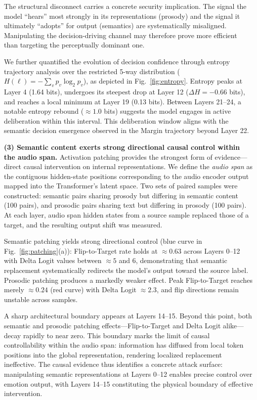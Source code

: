 The structural disconnect carries a concrete security implication. The signal the model ``hears'' most strongly in its representations (prosody) and the signal it ultimately ``adopts'' for output (semantics) are systematically misaligned. Manipulating the decision-driving channel may therefore prove more efficient than targeting the perceptually dominant one.

We further quantified the evolution of decision confidence through entropy trajectory analysis over the restricted 5-way distribution ($H(\ell) = -\sum_v p_v \log_2 p_v$), as depicted in Fig.~\ref{fig:entropy}. Entropy peaks at Layer 4 (1.64 bits), undergoes its steepest drop at Layer 12 ($\Delta H = -0.66$ bits), and reaches a local minimum at Layer 19 (0.13 bits). Between Layers 21--24, a notable entropy rebound ($\approx 1.0$ bits) suggests the model engages in active deliberation within this interval. This deliberation window aligns with the semantic decision emergence observed in the Margin trajectory beyond Layer 22.

\textbf{(3) Semantic content exerts strong directional causal control within the audio span.} Activation patching provides the strongest form of evidence---direct causal intervention on internal representations. We define the \textit{audio span} as the contiguous hidden-state positions corresponding to the audio encoder output mapped into the Transformer's latent space. Two sets of paired samples were constructed: semantic pairs sharing prosody but differing in semantic content (100 pairs), and prosodic pairs sharing text but differing in prosody (100 pairs). At each layer, audio span hidden states from a source sample replaced those of a target, and the resulting output shift was measured.

Semantic patching yields strong directional control (blue curve in Fig.~\ref{fig:patching}(a)): Flip-to-Target rate holds at $\approx 0.63$ across Layers 0--12 with Delta Logit values between $\approx 5$ and $6$, demonstrating that semantic replacement systematically redirects the model's output toward the source label. Prosodic patching produces a markedly weaker effect. Peak Flip-to-Target reaches merely $\approx 0.24$ (red curve) with Delta Logit $\approx 2.3$, and flip directions remain unstable across samples.

A sharp architectural boundary appears at Layers 14--15. Beyond this point, both semantic and prosodic patching effects---Flip-to-Target and Delta Logit alike---decay rapidly to near zero. This boundary marks the limit of causal controllability within the audio span: information has diffused from local token positions into the global representation, rendering localized replacement ineffective. The causal evidence thus identifies a concrete attack surface: manipulating semantic representations at Layers 0--12 enables precise control over emotion output, with Layers 14--15 constituting the physical boundary of effective intervention.

